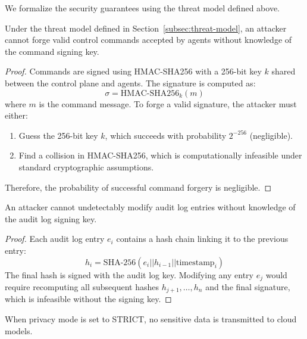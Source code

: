 We formalize the security guarantees using the threat model defined above.

\begin{theorem}
\label{thm:command-auth}
Under the threat model defined in Section~\ref{subsec:threat-model}, an attacker cannot forge valid control commands accepted by agents without knowledge of the command signing key.
\end{theorem}

\begin{proof}
Commands are signed using HMAC-SHA256 with a 256-bit key $k$ shared between the control plane and agents. The signature is computed as:
\begin{equation}
\sigma = \text{HMAC-SHA256}_k(m)
\end{equation}
where $m$ is the command message. To forge a valid signature, the attacker must either:
\begin{enumerate}
    \item Guess the 256-bit key $k$, which succeeds with probability $2^{-256}$ (negligible).
    \item Find a collision in HMAC-SHA256, which is computationally infeasible under standard cryptographic assumptions.
\end{enumerate}
Therefore, the probability of successful command forgery is negligible.
\end{proof}

\begin{theorem}
\label{thm:audit-integrity}
An attacker cannot undetectably modify audit log entries without knowledge of the audit log signing key.
\end{theorem}

\begin{proof}
Each audit log entry $e_i$ contains a hash chain linking it to the previous entry:
\begin{equation}
h_i = \text{SHA-256}(e_i || h_{i-1} || \text{timestamp}_i)
\end{equation}
The final hash is signed with the audit log key. Modifying any entry $e_j$ would require recomputing all subsequent hashes $h_{j+1}, \ldots, h_n$ and the final signature, which is infeasible without the signing key.
\end{proof}

\begin{theorem}
\label{thm:privacy}
When privacy mode is set to STRICT, no sensitive data is transmitted to cloud models.
\end{theorem}

